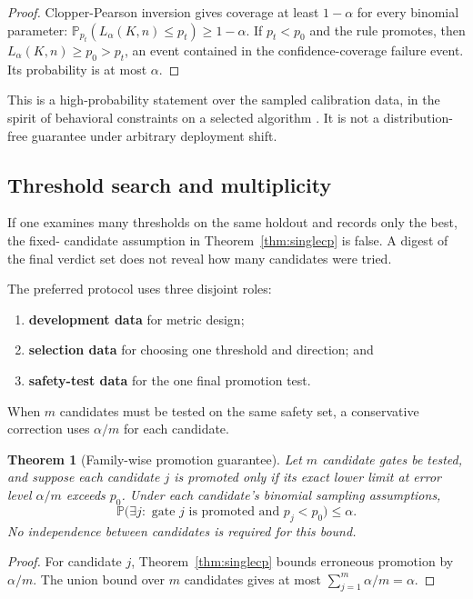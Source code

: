 \documentclass[11pt]{article}
\newtheorem{theorem}[definition]{Theorem}
\newcommand{\Prob}{\mathbb{P}}
\begin{document}
\begin{proof}
Clopper-Pearson inversion gives coverage at least $1-\alpha$ for every binomial parameter:
$\Prob_{p_t}(L_{\alpha}(K,n)\le p_t)\ge1-\alpha$. If $p_t<p_0$ and the rule promotes, then
$L_{\alpha}(K,n)\ge p_0>p_t$, an event contained in the confidence-coverage failure event.
Its probability is at most $\alpha$.
\end{proof}

This is a high-probability statement over the sampled calibration data, in the spirit of
behavioral constraints on a selected algorithm \cite{thomas2019seldonian}. It is not a
distribution-free guarantee under arbitrary deployment shift.

\subsection{Threshold search and multiplicity}

If one examines many thresholds on the same holdout and records only the best, the fixed-
candidate assumption in Theorem~\ref{thm:singlecp} is false. A digest of the final verdict
set does not reveal how many candidates were tried.

The preferred protocol uses three disjoint roles:

\begin{enumerate}
  \item \textbf{development data} for metric design;
  \item \textbf{selection data} for choosing one threshold and direction; and
  \item \textbf{safety-test data} for the one final promotion test.
\end{enumerate}

When $m$ candidates must be tested on the same safety set, a conservative correction uses
$\alpha/m$ for each candidate.

\begin{theorem}[Family-wise promotion guarantee]
\label{thm:family}
Let $m$ candidate gates be tested, and suppose each candidate $j$ is promoted only if its
exact lower limit at error level $\alpha/m$ exceeds $p_0$. Under each candidate's binomial
sampling assumptions,
\[
 \Prob\bigl(\exists j:\text{ gate }j\text{ is promoted and }p_j<p_0\bigr)\le\alpha.
\]
No independence between candidates is required for this bound.
\end{theorem}

\begin{proof}
For candidate $j$, Theorem~\ref{thm:singlecp} bounds erroneous promotion by $\alpha/m$.
The union bound over $m$ candidates gives at most
$\sum_{j=1}^{m}\alpha/m=\alpha$.
\end{proof}
\end{document}
